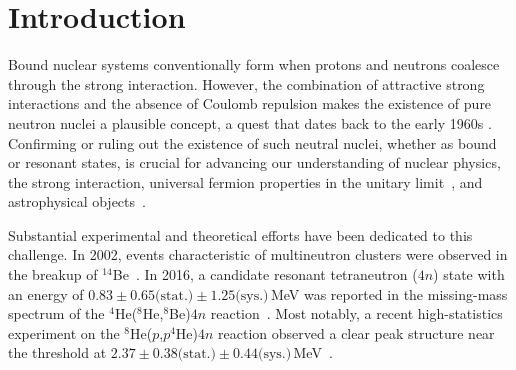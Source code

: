 \documentclass[aps,prl,showpacs,twocolumn,preprintnumbers,superscriptaddress,nofootinbib,floatfix,10pt]{revtex4-1}
\begin{document}
\begin{abstract}
The nature of the tetraneutron ($4n$) system remains a pivotal question in nuclear physics.
We investigate the $4n$ system using nuclear lattice effective field theory in finite volumes with a lattice size up to $L=30$~fm, employing both a high-precision N$^3$LO interaction and a simplified SU(4) symmetric one.
The ground-state energy is found to decrease smoothly with increasing box size, showing no plateau characteristic of a resonance.
We further compute the dineutron-dineutron scattering phase shift using L\"uscher's finite-volume method. At the smallest relative momenta, the extracted $2n$--$2n$ $S$-wave phase shift is small, consistent with a weak interaction in the dilute limit. At intermediate momenta, it exhibits a weak attraction with a peak of approximately $10^\circ$ at relative momentum of 60--84~MeV.
While this structure does not constitute a resonance, the corresponding confined $4n$ energy of 1.7--3.3~MeV lies close to the experimentally observed low-energy peak.
\end{abstract}
\maketitle
\date{today}

\section{Introduction}

Bound nuclear systems conventionally form when protons and neutrons coalesce through the strong interaction. However, the combination of attractive strong interactions and the absence of Coulomb repulsion makes the existence of pure neutron nuclei a plausible concept, a quest that dates back to the early 1960s \cite{ogloblin1989nuclei}. Confirming or ruling out the existence of such neutral nuclei, whether as bound or resonant states, is crucial for advancing our understanding of nuclear physics, the strong interaction, universal fermion properties in the unitary limit~\cite{Elhatisari:2016hui,Braaten:2004rn}, and astrophysical objects~\cite{Matsuki:2024ios,Ivanytskyi:2019ynz}.

Substantial experimental and theoretical efforts have been dedicated to this challenge. In 2002, events characteristic of multineutron clusters were observed in the breakup of $^{14}$Be~\cite{Marques:2001wh}. In 2016, a candidate resonant tetraneutron ($4n$) state with an energy of $0.83\pm 0.65\text{(stat.)}\pm 1.25\text{(sys.)}\,$MeV was reported in the missing-mass spectrum of the $^4$He($^8$He,$^8$Be)$4n$ reaction~\cite{Kisamori:2016jie}. Most notably, a recent high-statistics experiment on the $^8$He($p$,$p^4$He)$4n$ reaction observed a clear peak structure near the threshold at $2.37\pm 0.38\text{(stat.)}\pm 0.44\text{(sys.)}\,$MeV~\cite{Duer:2022ehf}.
\end{document}
